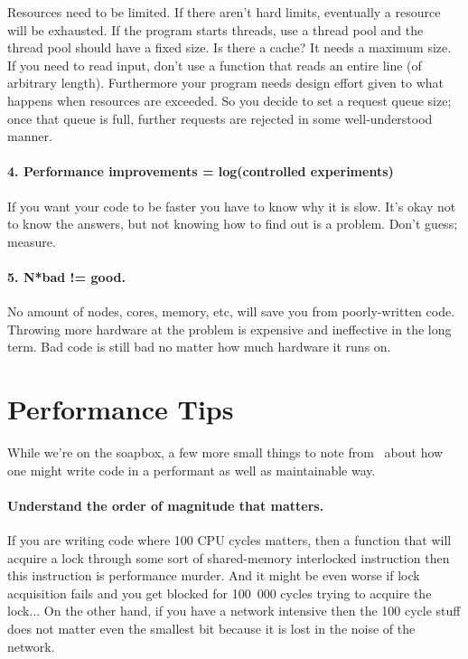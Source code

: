 \documentclass[a4paper]{report}
\begin{document}
Resources need to be limited. If there aren't hard limits, eventually a resource will be exhausted. If the program starts threads, use a thread pool and the thread pool should have a fixed size. Is there a cache? It needs a maximum size. If you need to read input, don't use a function that reads an entire line (of arbitrary length). Furthermore your program needs design effort given to what happens when resources are exceeded. So you decide to set a request queue size; once that queue is full, further requests are rejected in some well-understood manner. 

\paragraph{4. Performance improvements = log(controlled experiments)}
If you want your code to be faster you have to know why it is slow. It's okay not to know the answers, but not knowing how to find out is a problem. Don't guess; measure.


\paragraph{5. N*bad != good.}
No amount of nodes, cores, memory, etc, will save you from poorly-written code. Throwing more hardware at the problem is expensive and ineffective in the long term. Bad code is still bad no matter how much hardware it runs on. 

\section*{Performance Tips}

While we're on the soapbox, a few more small things to note from~\cite{preopt} about how one might write code in a performant as well as maintainable way.

\paragraph{Understand the order of magnitude that matters.} If you are writing code where 100 CPU cycles matters, then a function that will acquire a lock through some sort of shared-memory interlocked instruction then this instruction is performance murder. And it might be even worse if lock acquisition fails and you get blocked for 100~000 cycles trying to acquire the lock... On the other hand, if you have a network intensive then the 100 cycle stuff does not matter even the smallest bit because it is lost in the noise of the network.
\end{document}
